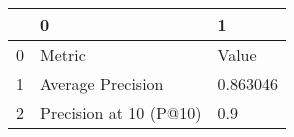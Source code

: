 \begin{tabular}{lll}
\toprule
{} &                       0 &         1 \\
\midrule
0 &                  Metric &     Value \\
1 &       Average Precision &  0.863046 \\
2 &  Precision at 10 (P@10) &       0.9 \\
\bottomrule
\end{tabular}
